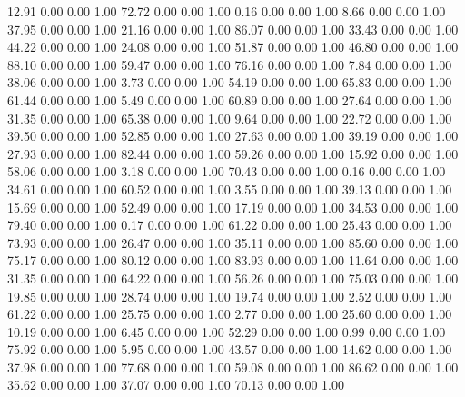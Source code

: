    12.91   0.00   0.00   1.00
   72.72   0.00   0.00   1.00
    0.16   0.00   0.00   1.00
    8.66   0.00   0.00   1.00
   37.95   0.00   0.00   1.00
   21.16   0.00   0.00   1.00
   86.07   0.00   0.00   1.00
   33.43   0.00   0.00   1.00
   44.22   0.00   0.00   1.00
   24.08   0.00   0.00   1.00
   51.87   0.00   0.00   1.00
   46.80   0.00   0.00   1.00
   88.10   0.00   0.00   1.00
   59.47   0.00   0.00   1.00
   76.16   0.00   0.00   1.00
    7.84   0.00   0.00   1.00
   38.06   0.00   0.00   1.00
    3.73   0.00   0.00   1.00
   54.19   0.00   0.00   1.00
   65.83   0.00   0.00   1.00
   61.44   0.00   0.00   1.00
    5.49   0.00   0.00   1.00
   60.89   0.00   0.00   1.00
   27.64   0.00   0.00   1.00
   31.35   0.00   0.00   1.00
   65.38   0.00   0.00   1.00
    9.64   0.00   0.00   1.00
   22.72   0.00   0.00   1.00
   39.50   0.00   0.00   1.00
   52.85   0.00   0.00   1.00
   27.63   0.00   0.00   1.00
   39.19   0.00   0.00   1.00
   27.93   0.00   0.00   1.00
   82.44   0.00   0.00   1.00
   59.26   0.00   0.00   1.00
   15.92   0.00   0.00   1.00
   58.06   0.00   0.00   1.00
    3.18   0.00   0.00   1.00
   70.43   0.00   0.00   1.00
    0.16   0.00   0.00   1.00
   34.61   0.00   0.00   1.00
   60.52   0.00   0.00   1.00
    3.55   0.00   0.00   1.00
   39.13   0.00   0.00   1.00
   15.69   0.00   0.00   1.00
   52.49   0.00   0.00   1.00
   17.19   0.00   0.00   1.00
   34.53   0.00   0.00   1.00
   79.40   0.00   0.00   1.00
    0.17   0.00   0.00   1.00
   61.22   0.00   0.00   1.00
   25.43   0.00   0.00   1.00
   73.93   0.00   0.00   1.00
   26.47   0.00   0.00   1.00
   35.11   0.00   0.00   1.00
   85.60   0.00   0.00   1.00
   75.17   0.00   0.00   1.00
   80.12   0.00   0.00   1.00
   83.93   0.00   0.00   1.00
   11.64   0.00   0.00   1.00
   31.35   0.00   0.00   1.00
   64.22   0.00   0.00   1.00
   56.26   0.00   0.00   1.00
   75.03   0.00   0.00   1.00
   19.85   0.00   0.00   1.00
   28.74   0.00   0.00   1.00
   19.74   0.00   0.00   1.00
    2.52   0.00   0.00   1.00
   61.22   0.00   0.00   1.00
   25.75   0.00   0.00   1.00
    2.77   0.00   0.00   1.00
   25.60   0.00   0.00   1.00
   10.19   0.00   0.00   1.00
    6.45   0.00   0.00   1.00
   52.29   0.00   0.00   1.00
    0.99   0.00   0.00   1.00
   75.92   0.00   0.00   1.00
    5.95   0.00   0.00   1.00
   43.57   0.00   0.00   1.00
   14.62   0.00   0.00   1.00
   37.98   0.00   0.00   1.00
   77.68   0.00   0.00   1.00
   59.08   0.00   0.00   1.00
   86.62   0.00   0.00   1.00
   35.62   0.00   0.00   1.00
   37.07   0.00   0.00   1.00
   70.13   0.00   0.00   1.00
